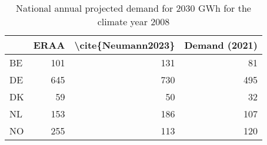 \begin{table}
\centering
\caption{National annual projected demand for 2030  GWh for the climate year 2008}
\begin{tabular}{lrrr}
\toprule
{} &  ERAA &  \textbackslash cite\{Neumann2023\} &  Demand (2021) \\
\midrule
BE &   101 &                 131 &             81 \\
DE &   645 &                 730 &            495 \\
DK &    59 &                  50 &             32 \\
NL &   153 &                 186 &            107 \\
NO &   255 &                 113 &            120 \\
\bottomrule
\end{tabular}
\end{table}
